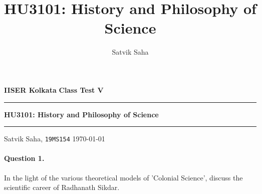 \documentclass[11pt]{article}
\title{HU3101: History and Philosophy of Science}
\author{Satvik Saha}
\date{}
\theoremstyle{remark}
\begin{document}
    \noindent\textbf{IISER Kolkata} \hfill \textbf{Class Test V}
    \vspace{3pt}
    \hrule
    \vspace{3pt}
    \begin{center}
    \LARGE{\textbf{HU3101: History and Philosophy of Science}}
    \end{center}
    \vspace{3pt}
    \hrule
    \vspace{3pt}
    Satvik Saha, \texttt{19MS154} \hfill \today
    \vspace{20pt}


    \paragraph{Question 1.} In the light of the various theoretical models of
    'Colonial Science', discuss the scientific career of Radhanath Sikdar.
\end{document}
